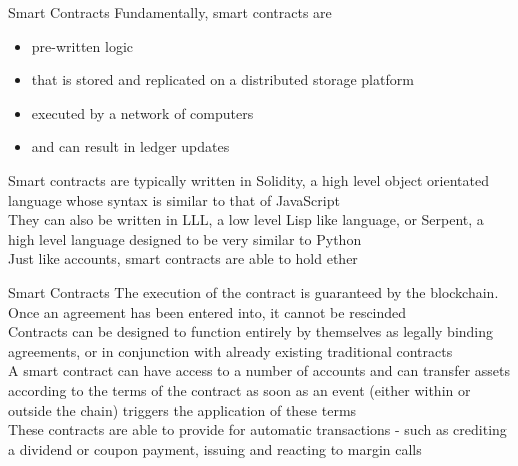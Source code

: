 \documentclass[9pt]{beamer}
\begin{document}
\begin{frame}{Smart Contracts}
	Fundamentally, smart contracts are
	\begin{itemize}
		\item pre-written logic
		\item that is stored and replicated on a distributed storage platform
		\item executed by a network of computers
		\item and can result in ledger updates
	\end{itemize}
	Smart contracts are typically written in Solidity, a high level object orientated language whose syntax is similar to that of JavaScript \\ \vspace{3mm}
	They can also be written in LLL, a low level Lisp like language, or Serpent, a high level language designed to be very similar to Python \\ \vspace{3mm}
	Just like accounts, smart contracts are able to hold ether
\end{frame}


\begin{frame}{Smart Contracts}
	The execution of the contract is guaranteed by the blockchain. Once an agreement has been entered into, it cannot be rescinded \\ \vspace{2mm}
	Contracts can be designed to function entirely by themselves as legally binding agreements, or in conjunction with already existing traditional contracts \\ \vspace{2mm}
	A smart contract can have access to a number of accounts and can transfer assets according to the terms of the contract as soon as an event (either within or outside the chain) triggers the application of these terms \\ \vspace{2mm}
	These contracts are able to provide for automatic transactions - such as crediting a dividend or coupon payment, issuing and reacting to margin calls
\end{frame}

\end{document}
